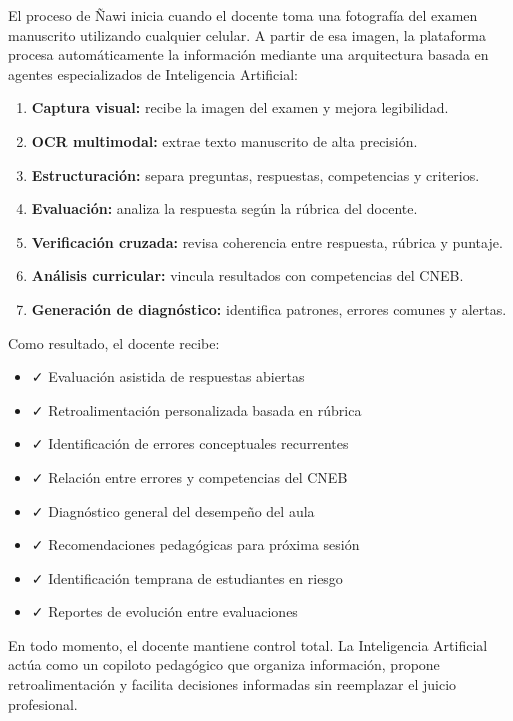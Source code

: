 \documentclass[12pt]{article}
\begin{document}
El proceso de Ñawi inicia cuando el docente toma una fotografía del examen manuscrito utilizando cualquier celular. A partir de esa imagen, la plataforma procesa automáticamente la información mediante una arquitectura basada en agentes especializados de Inteligencia Artificial:

\begin{enumerate}
    \item \textbf{Captura visual:} recibe la imagen del examen y mejora legibilidad.
    \item \textbf{OCR multimodal:} extrae texto manuscrito de alta precisión.
    \item \textbf{Estructuración:} separa preguntas, respuestas, competencias y criterios.
    \item \textbf{Evaluación:} analiza la respuesta según la rúbrica del docente.
    \item \textbf{Verificación cruzada:} revisa coherencia entre respuesta, rúbrica y puntaje.
    \item \textbf{Análisis curricular:} vincula resultados con competencias del CNEB.
    \item \textbf{Generación de diagnóstico:} identifica patrones, errores comunes y alertas.
\end{enumerate}

Como resultado, el docente recibe:

\begin{itemize}
    \item ✓ Evaluación asistida de respuestas abiertas
    \item ✓ Retroalimentación personalizada basada en rúbrica
    \item ✓ Identificación de errores conceptuales recurrentes
    \item ✓ Relación entre errores y competencias del CNEB
    \item ✓ Diagnóstico general del desempeño del aula
    \item ✓ Recomendaciones pedagógicas para próxima sesión
    \item ✓ Identificación temprana de estudiantes en riesgo
    \item ✓ Reportes de evolución entre evaluaciones
\end{itemize}

En todo momento, el docente mantiene control total. La Inteligencia Artificial actúa como un copiloto pedagógico que organiza información, propone retroalimentación y facilita decisiones informadas sin reemplazar el juicio profesional.
\end{document}
